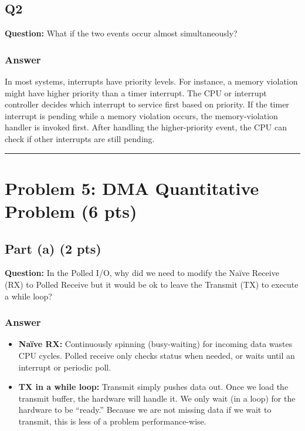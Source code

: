 \documentclass[12pt]{article}
\begin{document}
	\subsection*{Q2}
	\textbf{Question:} What if the two events occur almost simultaneously?
	
	\subsubsection*{Answer}
	In most systems, interrupts have priority levels. For instance, a memory violation might have higher priority than a timer interrupt. The CPU or interrupt controller decides which interrupt to service first based on priority. If the timer interrupt is pending while a memory violation occurs, the memory-violation handler is invoked first. After handling the higher-priority event, the CPU can check if other interrupts are still pending.
	
	\hrule
	\vspace{0.5cm}
	
	\section{Problem 5: DMA Quantitative Problem (6 pts)}
	\subsection*{Part (a) (2 pts)}
	\textbf{Question:} In the Polled I/O, why did we need to modify the Naïve Receive (RX) to Polled Receive but it would be ok to leave the Transmit (TX) to execute a while loop?
	
	\subsubsection*{Answer}
	\begin{itemize}
		\item \textbf{Naïve RX:} Continuously spinning (busy-waiting) for incoming data wastes CPU cycles. Polled receive only checks status when needed, or waits until an interrupt or periodic poll.
		\item \textbf{TX in a while loop:} Transmit simply pushes data out. Once we load the transmit buffer, the hardware will handle it. We only wait (in a loop) for the hardware to be “ready.” Because we are not missing data if we wait to transmit, this is less of a problem performance-wise.
	\end{itemize}
	
\end{document}
